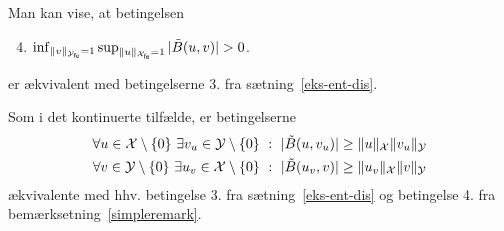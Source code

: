 \begin{remark} \label{simpleremark}
Man kan vise, at betingelsen
\begin{enumerate}
  \setcounter{enumi}{3}
  \item $\inf_{\|v\|_{\Yfe}=1} \sup_{\|u\|_{\Xfe}=1} |\tilde{B}(u,v)|>0$.
\end{enumerate}
er ækvivalent med betingelserne 3. fra sætning~\ref{eks-ent-dis}.
\end{remark}
\begin{remark}
Som i det kontinuerte tilfælde, er betingelserne
\begin{gather}
  \forall u\in\mathcal{X}\setminus\{0\}\ \exists v_u\in\mathcal{Y}\setminus\{0\} \ :\  
    |\tilde{B}(u,v_u)| \geq \|u\|_{\mathcal{X}} \|v_u\|_{\mathcal{Y}} \\
  \forall v\in\mathcal{Y}\setminus\{0\}\ \exists u_v\in\mathcal{X}\setminus\{0\} \ :\  
    |\tilde{B}(u_v,v)| \geq \|u_v\|_{\mathcal{X}} \|v\|_{\mathcal{Y}} 
\end{gather}
ækvivalente med hhv. betingelse 3. fra sætning~\ref{eks-ent-dis} og
betingelse 4. fra bemærk\-setning~\ref{simpleremark}. 
\end{remark}

